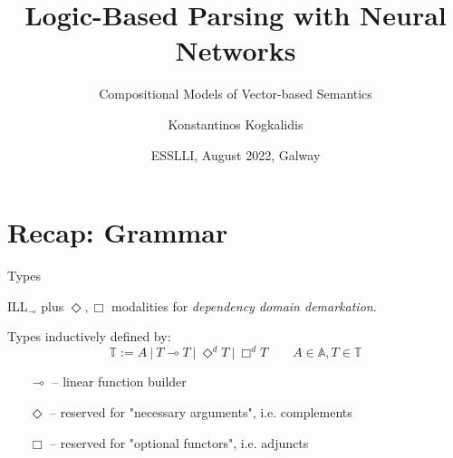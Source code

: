 \documentclass{beamer}
\newcommand{\li}{\!\multimap\!}
\begin{document}
\date{ESSLLI, August 2022, Galway}

\title[]{Logic-Based Parsing with Neural Networks}
\subtitle{Compositional Models of Vector-based Semantics}
\author{%
    Konstantinos Kogkalidis
}

{%
\frame{\titlepage
\hspace{-10pt}
}
}


\section{Recap: Grammar}

\begin{frame}{Types}
	\smaller	
	
		ILL$_{\li}$ plus $\Diamond, \Box$ modalities for \textit{dependency domain demarkation}.
	\vfill
		
	Types inductively defined by:
	\[
		\mathbb{T} := A \ | \  T \li T \ | \ \Diamond^d  T \ | \ \Box^d T \qquad A \in \mathbb{A}, T \in \mathbb{T}
	\]
	\vfill	

	\begin{itemize}
		\item[$\li$]		-- linear function builder
		\item[$\Diamond$] 	-- reserved for "necessary arguments", i.e. complements
		\item[$\Box$]		-- reserved for "optional functors", i.e. adjuncts
	\end{itemize}
\end{frame}
\end{document}
